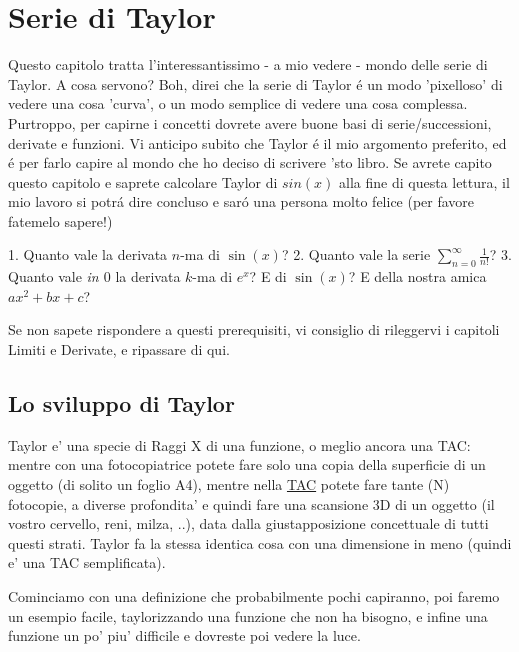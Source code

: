 \label{taylor}
\chapter{Serie di Taylor}

Questo capitolo tratta l'interessantissimo - a mio vedere - mondo delle serie di Taylor. A cosa servono?
Boh, direi che la serie di Taylor \'e un modo 'pixelloso' di vedere una cosa 'curva', o un modo semplice
di vedere una cosa complessa. Purtroppo, per capirne i concetti dovrete avere buone basi di serie/successioni,
derivate e funzioni. Vi anticipo subito che Taylor \'e il mio argomento preferito, ed \'e per farlo capire
al mondo che ho deciso di scrivere 'sto libro. Se avrete capito questo capitolo e saprete calcolare Taylor di $sin(x)$
alla fine di questa lettura, il mio lavoro si potr\'a dire concluso e sar\'o una persona molto felice (per favore
fatemelo sapere!)

\begin{prerequisito}
1. Quanto vale la derivata $n$-ma di $\sin(x)$? 
2. Quanto vale la serie $\sum_{n=0}^\infty \frac{1}{n!}$? 
3. Quanto vale {\em in $0$} la derivata $k$-ma di $e^x$? E di $\sin(x)$? E della nostra amica $ax^2+bx+c$?
\end{prerequisito}

Se non sapete rispondere a questi prerequisiti, vi consiglio di rileggervi i capitoli Limiti e Derivate, e ripassare di qui.

\section{Lo sviluppo di Taylor}

Taylor e' una specie di Raggi X di una funzione, o meglio ancora una TAC: mentre con una fotocopiatrice potete fare solo una copia della superficie di un oggetto (di solito un foglio A4),
mentre nella  \href{https://it.wikipedia.org/wiki/Tomografia_computerizzata}{TAC} potete fare tante (N) fotocopie,
a diverse profondita' e quindi fare una scansione 3D di un oggetto (il vostro cervello, reni, milza, ..), data dalla giustapposizione
concettuale di tutti questi strati. Taylor fa la stessa identica cosa con una dimensione in meno (quindi e' una TAC semplificata). 

Cominciamo con una definizione che probabilmente pochi capiranno, poi faremo un esempio facile, taylorizzando una funzione che non ha bisogno, e infine una funzione un po' piu' difficile e dovreste poi vedere la luce. 


